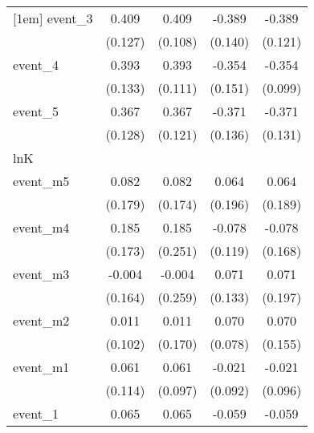 {\begin{tabular}{l*{4}{c}}
[1em]
event\_3     &       0.409\sym{**} &       0.409\sym{***}&      -0.389\sym{**} &      -0.389\sym{**} \\
            &     (0.127)         &     (0.108)         &     (0.140)         &     (0.121)         \\
[1em]
event\_4     &       0.393\sym{**} &       0.393\sym{***}&      -0.354\sym{*}  &      -0.354\sym{***}\\
            &     (0.133)         &     (0.111)         &     (0.151)         &     (0.099)         \\
[1em]
event\_5     &       0.367\sym{**} &       0.367\sym{**} &      -0.371\sym{**} &      -0.371\sym{**} \\
            &     (0.128)         &     (0.121)         &     (0.136)         &     (0.131)         \\
\hline
lnK         &                     &                     &                     &                     \\
event\_m5    &       0.082         &       0.082         &       0.064         &       0.064         \\
            &     (0.179)         &     (0.174)         &     (0.196)         &     (0.189)         \\
[1em]
event\_m4    &       0.185         &       0.185         &      -0.078         &      -0.078         \\
            &     (0.173)         &     (0.251)         &     (0.119)         &     (0.168)         \\
[1em]
event\_m3    &      -0.004         &      -0.004         &       0.071         &       0.071         \\
            &     (0.164)         &     (0.259)         &     (0.133)         &     (0.197)         \\
[1em]
event\_m2    &       0.011         &       0.011         &       0.070         &       0.070         \\
            &     (0.102)         &     (0.170)         &     (0.078)         &     (0.155)         \\
[1em]
event\_m1    &       0.061         &       0.061         &      -0.021         &      -0.021         \\
            &     (0.114)         &     (0.097)         &     (0.092)         &     (0.096)         \\
[1em]
event\_1     &       0.065         &       0.065         &      -0.059         &      -0.059         \\

\end{tabular}}
